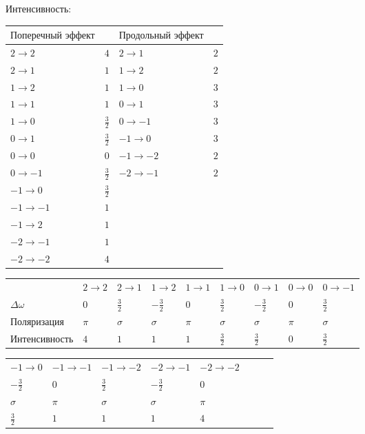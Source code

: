 Интенсивность:

\begin{tabular}{ | l | l | l | l |}
\hline
$\text{Поперечный эффект}$ & $ $ & $\text{Продольный эффект}$ & $ $ \\ \hline
$2 \rightarrow 2$ & $4$ & $2 \rightarrow 1$ & $2$\\
$2 \rightarrow 1$ & $1$ & $1 \rightarrow 2$ & $2$\\
$1 \rightarrow 2$ & $1$ & $1 \rightarrow 0$ & $3$\\
$1 \rightarrow 1$ & $1$ & $0 \rightarrow 1$ & $3$\\
$1 \rightarrow 0$ & $\frac32$ & $0 \rightarrow -1$ & $3$\\
$0 \rightarrow 1$ & $\frac32$ & $-1 \rightarrow 0$ & $3$\\
$0 \rightarrow 0$ & $0$ & $-1 \rightarrow -2$ & $2$\\
$0 \rightarrow -1$ & $\frac32$ & $-2 \rightarrow -1$ & $2$\\
$-1 \rightarrow 0$ & $\frac32$ & $ $ & $ $\\
$-1 \rightarrow -1$ & $1$ & $ $ & $ $\\
$-1 \rightarrow 2$ & $1$ & $ $ & $ $\\
$-2 \rightarrow -1$ & $1$ & $ $ & $ $\\
$-2 \rightarrow -2$ & $4$ & $ $ & $ $\\
\hline
\end{tabular}

\begin{tabular}{ | l | l | l | l | l | l | l | l | l |}
\hline
$ $ & $2 \rightarrow 2$ & $2 \rightarrow 1$ & $1 \rightarrow 2$ & $1 \rightarrow 1$ & $1 \rightarrow 0$ & $0 \rightarrow 1$ & $0 \rightarrow 0$ & $0 \rightarrow -1$ \\ 
$\Delta \omega$ & $0$ & $\frac32$ & $-\frac32$ & $0$ & $\frac32$ & $-\frac32$ & $0$ & $\frac32$\\ 
$\text{Поляризация}$ & $\pi$ & $\sigma$ & $\sigma$ & $\pi$ & $\sigma$ & $\sigma$ & $\pi$ & $\sigma$\\
$\text{Интенсивность}$ & $4$ & $1$ & $1$ & $1$ & $\frac32$ & $\frac32$ & $0$ & $\frac32$ \\
\hline
\end{tabular}

\begin{tabular}{| l | l | l | l | l | l | l | l |}
\hline
$-1 \rightarrow 0$ & $-1 \rightarrow -1$ & $-1 \rightarrow -2$ & $-2 \rightarrow -1$ & $-2 \rightarrow -2$\\
$-\frac32$ & $0$ & $\frac32$ & $-\frac32$ & $0$\\
$\sigma$ & $\pi$ & $\sigma$ & $\sigma$ & $\pi$\\
$\frac32$ & $1$ & $1$ & $1$ & $4$\\
\hline
\end{tabular}

